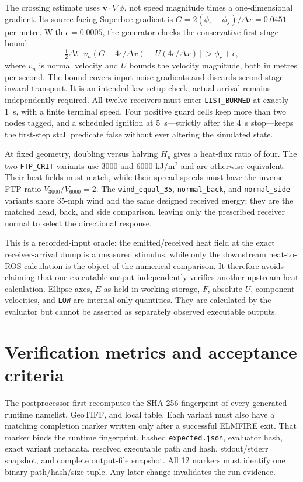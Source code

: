 The crossing estimate uses $\boldsymbol{v}\cdot\nabla\phi$, not speed
magnitude times a one-dimensional gradient. Its source-facing Superbee
gradient is $G=2(\phi_r-\phi_s)/\Delta x=0.0451$ per metre.
With $\epsilon=0.0005$, the generator checks the conservative first-stage
bound
\[
 \tfrac12\Delta t\left[v_n(G-4\epsilon/\Delta x)
       - U(4\epsilon/\Delta x)\right]>\phi_r+\epsilon,
\]
where $v_n$ is normal velocity and $U$ bounds the velocity magnitude, both
in metres per second. The bound covers input-noise gradients and discards
second-stage inward transport. It is an intended-law setup check; actual
arrival remains independently required. All twelve receivers must enter
\texttt{LIST\_BURNED} at exactly 1~s, with a finite terminal speed.
Four positive guard cells
keep more than two nodes tagged, and a scheduled ignition at 5~s---strictly
after the 4~s stop---keeps the first-step stall predicate false without ever
altering the simulated state.

At fixed geometry, doubling versus halving \(H_p\) gives a heat-flux ratio of
four. The two \texttt{FTP\_CRIT} variants use 3000 and 6000
$\si{\kilo\joule\per\square\metre}$ and are otherwise equivalent. Their heat
fields must match, while their spread speeds must have the inverse FTP ratio
$V_{3000}/V_{6000}=2$. The
\texttt{wind\_equal\_35}, \texttt{normal\_back}, and
\texttt{normal\_side} variants share 35-mph wind and the same designed received
energy; they are the matched head, back, and side comparison, leaving only the
prescribed receiver normal to select the directional response.

This is a recorded-input oracle: the emitted/received heat field at the exact
receiver-arrival dump is a measured stimulus, while only the downstream
heat-to-ROS calculation is the object of the numerical comparison.  It
therefore avoids claiming that one executable
output independently verifies another upstream heat calculation.  Ellipse
axes, \(E\) as held in working storage, \(F\), absolute \(U\), component
velocities, and \texttt{LOW} are internal-only quantities.  They are calculated
by the evaluator but cannot be asserted as separately observed executable
outputs.

\section{Verification metrics and acceptance criteria}

The postprocessor first recomputes the SHA-256 fingerprint of every generated
runtime namelist, GeoTIFF, and local table.  Each variant must also have a
matching completion marker written only after a successful ELMFIRE exit.  That
marker binds the runtime fingerprint, hashed \texttt{expected.json}, evaluator
hash, exact variant metadata, resolved executable path and hash, stdout/stderr
snapshot, and complete output-file snapshot.  All 12 markers must identify one
binary path/hash/size tuple.  Any later change invalidates the run evidence.

